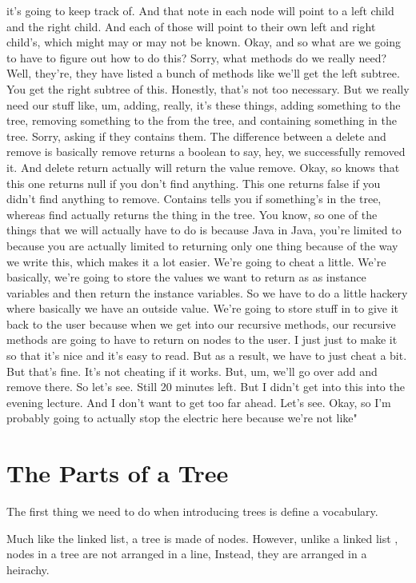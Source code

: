 it's going to keep track of. And that note in each node will point to a left child and the right child. And each of those will point to their own left and right child's, which might may or may not be known. Okay, and so what are we going to have to figure out how to do this? Sorry, what methods do we really need? Well, they're, they have listed a bunch of methods like we'll get the left subtree. You get the right subtree of this. Honestly, that's not too necessary. But we really need our stuff like, um, adding, really, it's these things, adding something to the tree, removing something to the from the tree, and containing something in the tree. Sorry, asking if they contains them. The difference between a delete and remove is basically remove returns a boolean to say, hey, we successfully removed it. And delete return actually will return the value remove. Okay, so knows that this one returns null if you don't find anything. This one returns false if you didn't find anything to remove. Contains tells you if something's in the tree, whereas find actually returns the thing in the tree. You know, so one of the things that we will actually have to do is because Java in Java, you're limited to because you are actually limited to returning only one thing because of the way we write this, which makes it a lot easier. We're going to cheat a little. We're basically, we're going to store the values we want to return as as instance variables and then return the instance variables. So we have to do a little hackery where basically we have an outside value. We're going to store stuff in to give it back to the user because when we get into our recursive methods, our recursive methods are going to have to return on nodes to the user. I just just to make it so that it's nice and it's easy to read. But as a result, we have to just cheat a bit. But that's fine. It's not cheating if it works. But, um, we'll go over add and remove there. So let's see. Still 20 minutes left. But I didn't get into this into the evening lecture. And I don't want to get too far ahead. Let's see. Okay, so I'm probably going to actually stop the electric here because we're not like" 

\section{The Parts of a Tree}

The first thing we need to do when introducing trees is define a vocabulary.  

Much like the linked list, a tree is made of nodes.
However, unlike a linked list , nodes in a tree are not arranged in a line,
Instead, they are arranged in a heirachy.

